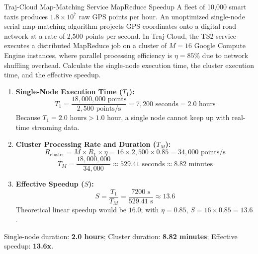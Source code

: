 \begin{solved}{Traj-Cloud Map-Matching Service MapReduce Speedup}
\Given A fleet of 10,000 smart taxis produces $1.8 \times 10^7$ raw GPS points per hour. An unoptimized single-node serial map-matching algorithm projects GPS coordinates onto a digital road network at a rate of 2,500 points per second. In Traj-Cloud, the TS2 service executes a distributed MapReduce job on a cluster of $M = 16$ Google Compute Engine instances, where parallel processing efficiency is $\eta = 85\%$ due to network shuffling overhead.
Calculate the single-node execution time, the cluster execution time, and the effective speedup.
\Steps
\begin{enumerate}[leftmargin=*]
  \item \textbf{Single-Node Execution Time ($T_1$):}
  \begin{equation}
  T_1 = \frac{18,000,000\text{ points}}{2,500\text{ points/s}} = 7,200\text{ seconds} = 2.0\text{ hours}
  \end{equation}
  Because $T_1 = 2.0\text{ hours} > 1.0\text{ hour}$, a single node cannot keep up with real-time streaming data.
  \item \textbf{Cluster Processing Rate and Duration ($T_M$):}
  \begin{equation}
  R_{\text{cluster}} = M \times R_1 \times \eta = 16 \times 2,500 \times 0.85 = 34,000\text{ points/s}
  \end{equation}
  \begin{equation}
  T_M = \frac{18,000,000}{34,000} \approx 529.41\text{ seconds} \approx 8.82\text{ minutes}
  \end{equation}
  \item \textbf{Effective Speedup ($S$):}
  \begin{equation}
  S = \frac{T_1}{T_M} = \frac{7200\text{ s}}{529.41\text{ s}} \approx 13.6
  \end{equation}
  Theoretical linear speedup would be $16.0$; with $\eta = 0.85$, $S = 16 \times 0.85 = 13.6$.
\end{enumerate}
\Answer Single-node duration: \textbf{2.0 hours}; Cluster duration: \textbf{8.82 minutes}; Effective speedup: \textbf{13.6x}.
\end{solved}

